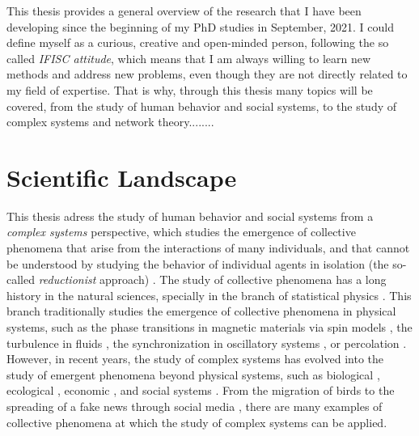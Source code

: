 \setcounter{page}{1}

This thesis provides a general overview of the research that I have been developing since the beginning of my PhD studies in September, 2021. I could define myself as a curious, creative and open-minded person, following the so called \textit{IFISC attitude}, which means that I am always willing to learn new methods and address new problems, even though they are not directly related to my field of expertise. That is why, through this thesis many topics will be covered, from the study of human behavior and social systems, to the study of complex systems and network theory........

\section{\label{sec:scie_lands} Scientific Landscape}

This thesis adress the study of human behavior and social systems from a \textit{complex systems} perspective, which studies the emergence of collective phenomena that arise from the interactions of many individuals, and that cannot be understood by studying the behavior of individual agents in isolation (the so-called \textit{reductionist} approach) \cite{anderson1972more}. The study of collective phenomena has a long history in the natural sciences, specially in the branch of statistical physics \cite{stanley1971phase}. This branch traditionally studies the emergence of collective phenomena in physical systems, such as the phase transitions in magnetic materials via spin models \cite{onsager-1944}, the turbulence in fluids \cite{frisch1995turbulence}, the synchronization in oscillatory systems \cite{pikovsky2001universal}, or percolation \cite{stauffer-1985}. However, in recent years, the study of complex systems has evolved into the study of emergent phenomena beyond physical systems, such as biological \cite{prigogine1977self}, ecological \cite{may-2001}, economic \cite{arthur-1994}, and social systems \cite{castellano-2009}. From the migration of birds \cite{roche-1997} to the spreading of a fake news through social media \cite{vosoughi-2018}, there are many examples of collective phenomena at which the study of complex systems can be applied.


